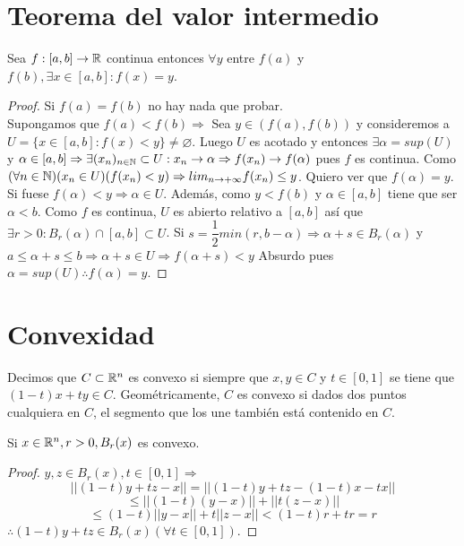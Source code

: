 \section{Teorema del valor intermedio}

\begin{theorem}
  Sea $f: [a, b] \to \mathbb{R}$ continua entonces $\forall y$ entre $f(a)$ y $f(b), \exists x \in [a, b] : f(x) = y$.

  \begin{proof}
    Si $f(a) = f(b)$ no hay nada que probar. \\
    Supongamos que $f(a) < f(b) \Rightarrow$ Sea $y \in (f(a), f(b))$ y consideremos a $U = \{ x \in [a, b] : f(x) < y \} \neq \varnothing$. Luego $U$ es acotado y entonces $\exists \alpha = sup(U)$ y $\alpha \in [a, b] \Rightarrow \exists (x_n)_{n \in \mathbb{N}} \subset U : x_n \to \alpha \Rightarrow f(x_n) \to f(\alpha)$ pues $f$ es continua. Como $(\forall n \in \mathbb{N})(x_n \in U)(f(x_n) < y) \Rightarrow lim_{n \to +\infty} f(x_n) \leq y$. Quiero ver que $f(\alpha) = y$. Si fuese $f(\alpha) < y \Rightarrow \alpha \in U$. Además, como $y < f(b)$ y $\alpha \in [a, b]$ tiene que ser $\alpha < b$. Como $f$ es continua, $U$ es abierto relativo a $[a, b]$ así que $\exists r > 0 : B_r(\alpha) \cap [a, b] \subset U$. Si $s = \dfrac{1}{2} min(r, b-\alpha) \Rightarrow \alpha + s \in B_r(\alpha)$ y $a \leq \alpha + s \leq b \Rightarrow \alpha + s \in U \Rightarrow f(\alpha + s) < y$ Absurdo pues $\alpha = sup(U) \therefore f(\alpha) = y$.
  \end{proof}
\end{theorem}

\section{Convexidad}

\begin{definition}[Convexidad]
  Decimos que $C \subset \mathbb{R}^n$ es convexo si siempre que $x, y \in C$ y $t \in [0, 1]$ se tiene que $(1-t)x+ty \in C$. Geométricamente, $C$ es convexo si dados dos puntos cualquiera en $C$, el segmento que los une también está contenido en $C$.
\end{definition}

\begin{eg}
  Si $x \in \mathbb{R}^n, r > 0, B_r(x)$ es convexo.
  \begin{proof}
    $y, z \in B_r(x), t \in [0,1] \Rightarrow$ \begin{equation} ||(1-t)y+tz - x|| = || (1-t)y + tz - (1-t)x - tx || \end{equation} \begin{equation} \leq ||(1 -t) (y-x) || + ||t(z-x)|| \end{equation}
    \begin{equation} \leq (1-t) ||y-x|| + t ||z-x|| < (1-t)r + tr = r \end{equation} $\therefore (1-t)y + tz \in B_r(x) (\forall t \in [0, 1])$.
  \end{proof}
\end{eg}

